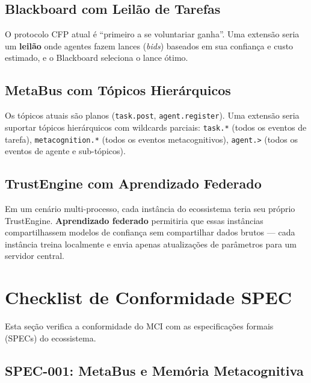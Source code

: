\subsection{Blackboard com Leilão de Tarefas}

O protocolo CFP atual é ``primeiro a se voluntariar ganha''. Uma extensão seria um \textbf{leilão} onde agentes fazem lances (\textit{bids}) baseados em sua confiança e custo estimado, e o Blackboard seleciona o lance ótimo.

\subsection{MetaBus com Tópicos Hierárquicos}

Os tópicos atuais são planos (\texttt{task.post}, \texttt{agent.register}). Uma extensão seria suportar tópicos hierárquicos com wildcards parciais: \texttt{task.*} (todos os eventos de tarefa), \texttt{metacognition.*} (todos os eventos metacognitivos), \texttt{agent.>} (todos os eventos de agente e sub-tópicos).

\subsection{TrustEngine com Aprendizado Federado}

Em um cenário multi-processo, cada instância do ecossistema teria seu próprio TrustEngine. \textbf{Aprendizado federado} permitiria que essas instâncias compartilhassem modelos de confiança sem compartilhar dados brutos — cada instância treina localmente e envia apenas atualizações de parâmetros para um servidor central.

\section{Checklist de Conformidade SPEC}
\label{sec:spec-compliance}

Esta seção verifica a conformidade do MCI com as especificações formais (SPECs) do ecossistema.

\subsection{SPEC-001: MetaBus e Memória Metacognitiva}

